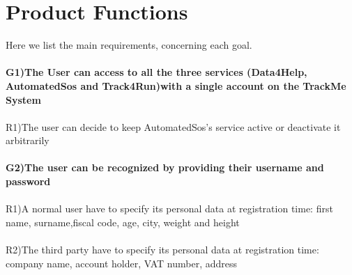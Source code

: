 \section{Product Functions}

Here we list the main requirements, concerning each goal. \\ \\
\textbf{G1)The User can access to all the three services (Data4Help, AutomatedSos and Track4Run)with a single account on the TrackMe System} \\ \\
R1)The user can decide to keep AutomatedSos's service active or deactivate it arbitrarily \\ \\
\textbf{G2)The user can be recognized by providing their username and password} \\ \\
R1)A normal user  have to specify its personal data at registration time: first name, surname,fiscal code, age, city, weight and height \\ \\
R2)The third party have to specify its personal data at registration time: company name, account holder, VAT number, address \newline \newline



